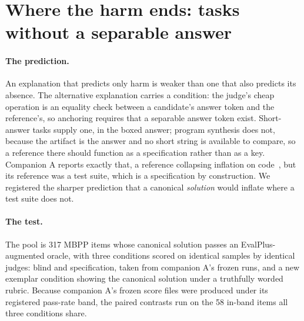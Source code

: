 \documentclass[11pt]{article}
\begin{document}
\section{Where the harm ends: tasks without a separable answer}
\label{sec:code}

\paragraph{The prediction.}
An explanation that predicts only harm is weaker than one that also predicts its absence.
The alternative explanation carries a condition: the judge's cheap operation is an equality check between a candidate's answer token and the reference's, so anchoring requires that a separable answer token exist.
Short-answer tasks supply one, in the boxed answer; program synthesis does not, because the artifact is the answer and no short string is available to compare, so a reference there should function as a specification rather than as a key.
Companion A reports exactly that, a reference collapsing inflation on code~\cite{companionA}, but its reference was a test suite, which is a specification by construction.
We registered the sharper prediction that a canonical \emph{solution} would inflate where a test suite does not.

\paragraph{The test.}
The pool is 317 MBPP items whose canonical solution passes an EvalPlus-augmented oracle, with three conditions scored on identical samples by identical judges: blind and specification, taken from companion A's frozen runs, and a new exemplar condition showing the canonical solution under a truthfully worded rubric. Because companion A's frozen score files were produced under its registered pass-rate band, the paired contrasts run on the 58 in-band items all three conditions share.
\end{document}
